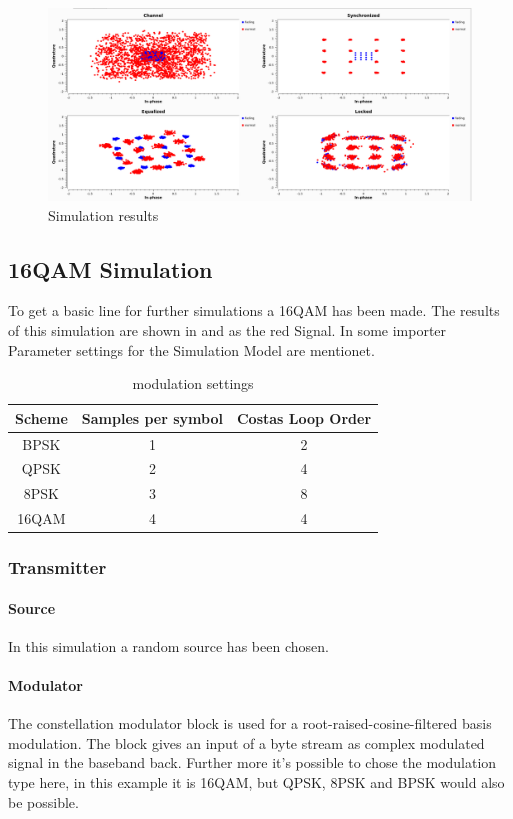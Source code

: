 \begin{figure}
	\includegraphics[width=\linewidth]{./figures/screenshots/QAM16_Fading_2_.png}
	\caption{Simulation results}
	\label{fig:simul16QAM_1}	
\end{figure}

\subsection{16QAM Simulation}
To get a basic line for further simulations a 16QAM has been made. The results of this simulation are shown in  and  as the red Signal. In  some importer Parameter settings for the Simulation Model are mentionet.

\begin{table}[]
	\centering
	\caption{modulation settings}
	\begin{tabular}{ccc}
		\toprule
		Scheme & Samples per symbol & Costas Loop Order\\
		\midrule
		BPSK  & 1 & 2 \\
		QPSK  & 2 & 4 \\
		8PSK  & 3 & 8 \\
		16QAM & 4 & 4 \\
		\bottomrule
	\end{tabular}
	\label{tab:modulation_settings}
\end{table}


\subsubsection{Transmitter}
\paragraph{Source}
In this simulation a random source has been chosen.
\paragraph{Modulator}
The constellation modulator block is used for a root-raised-cosine-filtered basis modulation. The block gives an input of a byte stream as complex modulated signal in the baseband back. 
Further more it's possible to chose the modulation type here, in this example it is 16QAM, but QPSK, 8PSK and BPSK would also be possible.


